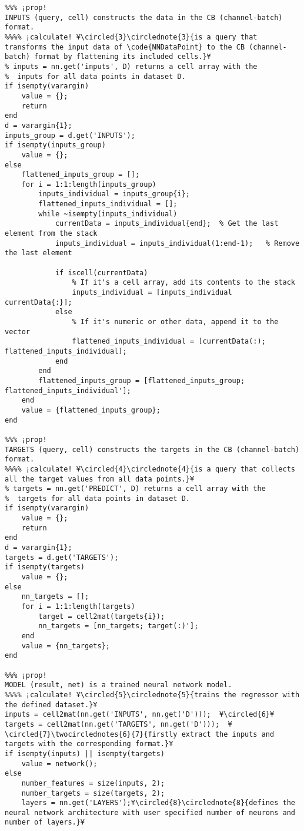 \documentclass{tufte-handout}
\begin{document}
\begin{lstlisting}
%%% ¡prop!
INPUTS (query, cell) constructs the data in the CB (channel-batch) format.
%%%% ¡calculate! ¥\circled{3}\circlednote{3}{is a query that transforms the input data of \code{NNDataPoint} to the CB (channel-batch) format by flattening its included cells.}¥
% inputs = nn.get('inputs', D) returns a cell array with the
%  inputs for all data points in dataset D.
if isempty(varargin)
    value = {};
    return
end
d = varargin{1};
inputs_group = d.get('INPUTS');
if isempty(inputs_group)
    value = {};
else
    flattened_inputs_group = [];
    for i = 1:1:length(inputs_group)
        inputs_individual = inputs_group{i};
        flattened_inputs_individual = [];
        while ~isempty(inputs_individual)
            currentData = inputs_individual{end};  % Get the last element from the stack
            inputs_individual = inputs_individual(1:end-1);   % Remove the last element

            if iscell(currentData)
                % If it's a cell array, add its contents to the stack
                inputs_individual = [inputs_individual currentData{:}];
            else
                % If it's numeric or other data, append it to the vector
                flattened_inputs_individual = [currentData(:); flattened_inputs_individual];
            end
        end
        flattened_inputs_group = [flattened_inputs_group; flattened_inputs_individual'];
    end
    value = {flattened_inputs_group};
end

%%% ¡prop!
TARGETS (query, cell) constructs the targets in the CB (channel-batch) format.
%%%% ¡calculate! ¥\circled{4}\circlednote{4}{is a query that collects all the target values from all data points.}¥
% targets = nn.get('PREDICT', D) returns a cell array with the
%  targets for all data points in dataset D.
if isempty(varargin)
    value = {};
    return
end
d = varargin{1};
targets = d.get('TARGETS');
if isempty(targets)
    value = {};
else
    nn_targets = [];
    for i = 1:1:length(targets)
        target = cell2mat(targets{i});
        nn_targets = [nn_targets; target(:)'];
    end
    value = {nn_targets};
end

%%% ¡prop!
MODEL (result, net) is a trained neural network model.
%%%% ¡calculate! ¥\circled{5}\circlednote{5}{trains the regressor with the defined dataset.}¥
inputs = cell2mat(nn.get('INPUTS', nn.get('D')));  ¥\circled{6}¥
targets = cell2mat(nn.get('TARGETS', nn.get('D')));  ¥\circled{7}\twocirclednotes{6}{7}{firstly extract the inputs and targets with the corresponding format.}¥
if isempty(inputs) || isempty(targets)
    value = network();
else
    number_features = size(inputs, 2);
    number_targets = size(targets, 2);
    layers = nn.get('LAYERS');¥\circled{8}\circlednote{8}{defines the neural network architecture with user specified number of neurons and number of layers.}¥
    

\end{lstlisting}
\end{document}
